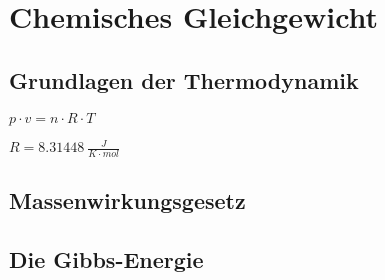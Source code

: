 \section{Chemisches Gleichgewicht}

\subsection{Grundlagen der Thermodynamik}

\large{

$ p \cdot v = n \cdot R \cdot T $

$R = 8.31448 \ \frac{J}{K \cdot mol}$
}

\subsection{Massenwirkungsgesetz}

\subsection{Die Gibbs-Energie}